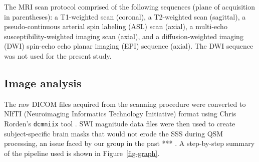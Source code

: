 \documentclass[
true
]{sn-jnl}
\begin{document}
The MRI scan protocol comprised of the following sequences (plane of
acquisition in parentheses): a T1-weighted scan (coronal), a T2-weighted
scan (sagittal), a pseudo-continuous arterial spin labeling (ASL) scan
\citep{alsopRecommendedImplementationArterial2015} (axial), a multi-echo
susceptibility-weighted imaging scan
\citep{denkSusceptibilityWeightedImaging2010} (axial), and a
diffusion-weighted imaging (DWI) spin-echo echo planar imaging (EPI)
sequence (axial). The DWI sequence was not used for the present study.

\subsection{Image analysis}\label{image-analysis}

The raw DICOM files acquired from the scanning procedure were converted
to NIfTI (Neuroimaging Informatics Technology Initiative) format using
Chris Rorden's \texttt{dcmniix} tool
\citep{liFirstStepNeuroimaging2016}. SWI magnitude data files were then
used to create subject-specific brain masks that would not erode the SSS
during QSM processing, an issue faced by our group in the past *** . A
step-by-step summary of the pipeline used is shown in
Figure~\ref{fig-graph}.
\end{document}
